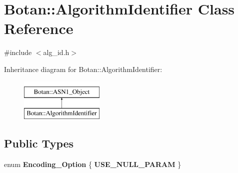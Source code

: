 \hypertarget{classBotan_1_1AlgorithmIdentifier}{\section{Botan\-:\-:Algorithm\-Identifier Class Reference}
\label{classBotan_1_1AlgorithmIdentifier}
}


{\ttfamily \#include $<$alg\-\_\-id.\-h$>$}

Inheritance diagram for Botan\-:\-:Algorithm\-Identifier\-:\begin{figure}[H]
\begin{center}
\leavevmode
\includegraphics[height=2.000000cm]{classBotan_1_1AlgorithmIdentifier}
\end{center}
\end{figure}
\subsection*{Public Types}
\begin{DoxyCompactItemize}
\item 
enum {\bfseries Encoding\-\_\-\-Option} \{ {\bfseries U\-S\-E\-\_\-\-N\-U\-L\-L\-\_\-\-P\-A\-R\-A\-M}
 \}
\end{DoxyCompactItemize}
